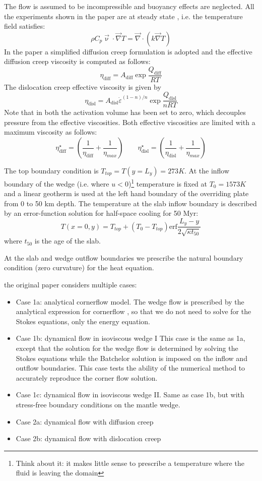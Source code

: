 The flow is assumed to be incompressible and buoyancy effects are neglected.
All the experiments shown in the paper are at steady state , i.e. the 
temperature field satisfies:
\begin{equation}
\rho C_p \vec\upnu\cdot\vec\nabla T = \vec\nabla\cdot (k\vec\nabla T)
\end{equation}
In the paper a simplified diffusion creep formulation is adopted and the 
effective diffusion creep viscosity is computed as follows:
\[
\eta_{\text{diff}}=A_{\text{diff}} \exp \frac{Q_{\text{diff}}}{RT}
\]
The dislocation creep effective viscosity is given by
\[
\eta_{\text{disl}}=
A_{\text{disl}} \dot\varepsilon^{(1-n)/n} \exp \frac{Q_{\text{disl}}}{nRT}
\]
Note that in both the activation volume has been set to zero, which decouples pressure
from the effective viscosities.
Both effective viscosities are limited with a maximum viscosity 
as follows:
\[
\eta_{\text{diff}}^\star = \left( \frac{1}{\eta_{\text{diff}}} +\frac{1}{\eta_{max}}  \right)
\qquad
\eta_{\text{disl}}^\star = \left( \frac{1}{\eta_{\text{disl}}} +\frac{1}{\eta_{max}}  \right)
\]

The top boundary condition is $T_{top} = T(y = L_y) = 273 K$. 
At the inflow boundary of the wedge (i.e. where $u<0$)\footnote{Think
about it: it makes little sense to prescribe a temperature where the fluid is leaving the domain} 
temperature is fixed at $T_0 = 1573 K$ 
and a linear geotherm is used at the left hand boundary of the overriding
plate from 0 to 50 km depth. The temperature at the slab inflow
boundary is described by an error-function solution for half-space
cooling for 50 Myr:
\[
T(x=0,y)=T_{top}+(T_0-T_{top}) \text{erf} \frac{L_y-y}{2\sqrt{\kappa t_{50}}}
\]
where $t_{50}$ is the age of the slab. 

At the slab and wedge outflow boundaries we prescribe
the natural boundary condition (zero curvature) for the heat equation.

the original paper considers multiple cases:
\begin{itemize}
\item Case 1a: analytical cornerflow model. The wedge flow is prescribed by
the analytical expression for cornerflow \cite{batchelor}, so that we do not need to 
solve for the Stokes equations, only the energy equation.
\item Case 1b: dynamical flow in isoviscous wedge I
This case is the same as 1a, except that the solution for the wedge
flow is determined by solving the Stokes equations 
while the Batchelor solution is imposed on the inflow and outflow boundaries.
This case tests the ability of the numerical method to accurately 
reproduce the corner flow solution.

\item Case 1c: dynamical flow in isoviscous wedge II. Same as case 1b, but with stress-free 
boundary conditions on the mantle wedge.

\item Case 2a: dynamical flow with diffusion creep
\item Case 2b: dynamical flow with dislocation creep

\end{itemize}

